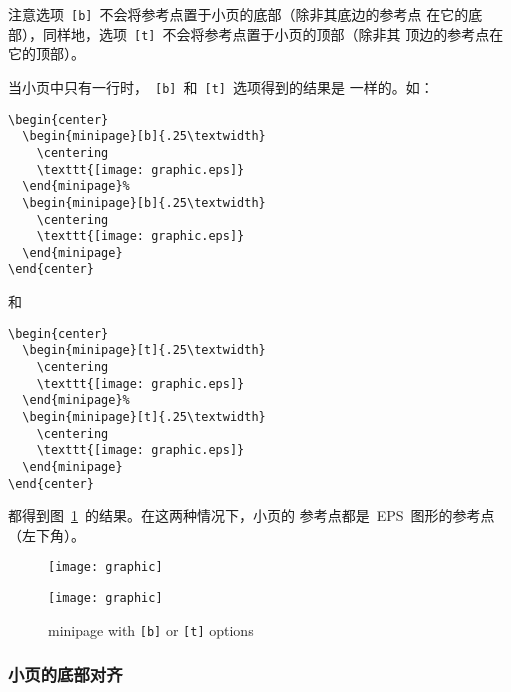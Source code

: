 注意选项~\texttt{[b]}~不会将参考点置于小页的底部（除非其底边的参考点
在它的底部），同样地，选项~\texttt{[t]}~不会将参考点置于小页的顶部（除非其
顶边的参考点在它的顶部）。

当小页中只有一行时，~\texttt{[b]}~和~\texttt{[t]}~选项得到的结果是
一样的。如：
\begin{Verbatim}[xleftmargin=1cm]
\begin{center}
  \begin{minipage}[b]{.25\textwidth}
    \centering
    \texttt{[image: graphic.eps]}
  \end{minipage}%
  \begin{minipage}[b]{.25\textwidth}
    \centering
    \texttt{[image: graphic.eps]}
  \end{minipage}
\end{center}
\end{Verbatim}
和
\begin{Verbatim}[xleftmargin=1cm]
\begin{center}
  \begin{minipage}[t]{.25\textwidth}
    \centering
    \texttt{[image: graphic.eps]}
  \end{minipage}%
  \begin{minipage}[t]{.25\textwidth}
    \centering
    \texttt{[image: graphic.eps]}
  \end{minipage}
\end{center}
\end{Verbatim}
都得到图~\ref{fig:minipagesamp-1}~的结果。在这两种情况下，小页的
参考点都是~EPS~图形的参考点（左下角）。
\begin{figure}
\begin{center}
  \begin{minipage}[t]{.25\textwidth}
    \centering
    \texttt{[image: graphic]}
  \end{minipage}%
  \begin{minipage}[t]{.25\textwidth}
    \centering
    \texttt{[image: graphic]}
  \end{minipage}
\end{center}
\caption{minipage with \texttt{[b]} or \texttt{[t]} options}\label{fig:minipagesamp-1}
\end{figure}

\subsubsection{小页的底部对齐}

